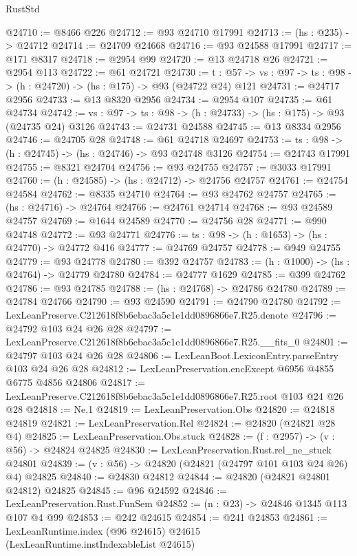 \begin{lexlean}{RustStd}
\begin{coremodule}
@24710 := @8466 @226
@24712 := @93 @24710 @17991
@24713 := (hs : @235) -> @24712
@24714 := @24709 @24668
@24716 := @93 @24588 @17991
@24717 := @171 @8317
@24718 := @2954 @99
@24720 := @13 @24718 @26
@24721 := @2954 @113
@24722 := @61 @24721
@24730 := {t : @57} ->
  {vs : @97} -> {ts : @98} -> (h : @24720) -> (hs : @175) -> @93 (@24722 @24) @121
@24731 := @24717 @2956
@24733 := @13 @8320 @2956
@24734 := @2954 @107
@24735 := @61 @24734
@24742 := {vs : @97} -> {ts : @98} -> (h : @24733) -> (hs : @175) -> @93 (@24735 @24) @3126
@24743 := @24731 @24588
@24745 := @13 @8334 @2956
@24746 := @24705 @28
@24748 := @61 @24718 @24697
@24753 := {ts : @98} -> (h : @24745) -> (hs : @24746) -> @93 @24748 @3126
@24754 := @24743 @17991
@24755 := @8321 @24704
@24756 := @93 @24755
@24757 := @3033 @17991
@24760 := (h : @24585) -> (hs : @24712) -> @24756 @24757
@24761 := @24754 @24584
@24762 := @8335 @24710
@24764 := @93 @24762 @24757
@24765 := (hs : @24716) -> @24764
@24766 := @24761 @24714
@24768 := @93 @24589 @24757
@24769 := @1644 @24589
@24770 := @24756 @28
@24771 := @990 @24748
@24772 := @93 @24771
@24776 := {ts : @98} -> (h : @1653) -> (hs : @24770) -> @24772 @416
@24777 := @24769 @24757
@24778 := @949 @24755
@24779 := @93 @24778
@24780 := @392 @24757
@24783 := (h : @1000) -> (hs : @24764) -> @24779 @24780
@24784 := @24777 @1629
@24785 := @399 @24762
@24786 := @93 @24785
@24788 := (hs : @24768) -> @24786 @24780
@24789 := @24784 @24766
@24790 := @93 @24590
@24791 := @24790 @24780
@24792 := LexLeanPreserve.C212618f8b6ebac3a5c1e1dd0896866e7.R25.denote
@24796 := @24792 @103 @24 @26 @28
@24797 := LexLeanPreserve.C212618f8b6ebac3a5c1e1dd0896866e7.R25.__fits_0
@24801 := @24797 @103 @24 @26 @28
@24806 := LexLeanBoot.LexiconEntry.parseEntry @103 @24 @26 @28
@24812 := LexLeanPreservation.encExcept @6956 @4855 @6775 @4856 @24806
@24817 := LexLeanPreserve.C212618f8b6ebac3a5c1e1dd0896866e7.R25.root @103 @24 @26 @28
@24818 := Ne.{1}
@24819 := LexLeanPreservation.Obs
@24820 := @24818 @24819
@24821 := LexLeanPreservation.Rel
@24824 := @24820 (@24821 @28 @4)
@24825 := LexLeanPreservation.Obs.stuck
@24828 := (f : @2957) -> (v : @56) -> @24824 @24825
@24830 := LexLeanPreservation.Rust.rel_ne_stuck @24801
@24839 := (v : @56) -> @24820 (@24821 (@24797 @101 @103 @24 @26) @4) @24825
@24840 := @24830 @24812
@24844 := @24820 (@24821 @24801 @24812) @24825
@24845 := @96 @24592
@24846 := LexLeanPreservation.Rust.FunSem
@24852 := (n : @23) -> @24846 @1345 @113 @107 @4 @99
@24853 := @242 @24615
@24854 := @241 @24853
@24861 := LexLeanRuntime.index (@96 @24615) @24615 (LexLeanRuntime.instIndexableList @24615)

\end{coremodule}
\end{lexlean}
